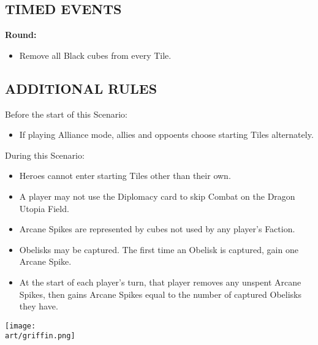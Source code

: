 \begin{multicols}{2}
\subsection*{\MakeUppercase{Timed Events}}

\textbf{ Round:}
\begin{itemize}
  \item Remove all Black cubes from every Tile.
\end{itemize}

\subsection*{\MakeUppercase{Additional Rules}}

Before the start of this Scenario:

\begin{itemize}
  \item If playing Alliance mode, allies and oppoents choose starting Tiles alternately.
\end{itemize}

During this Scenario:

\begin{itemize}
  \item Heroes cannot enter starting Tiles other than their own.
  \item A player may not use the Diplomacy card to skip Combat on the Dragon Utopia Field.
  \item Arcane Spikes are represented by cubes not used by any player's Faction.
\end{itemize}

\vspace*{\fill}

\columnbreak

\begin{itemize}
    \item Obelisks may be captured. The first time an Obelisk is captured, gain one Arcane Spike.
    \item At the start of each player's turn, that player removes any unspent Arcane Spikes, then gains Arcane Spikes equal to the number of captured Obelisks they have.
\end{itemize}

\vspace{1em}

\texttt{[image: \\art/griffin.png]}

\end{multicols}

